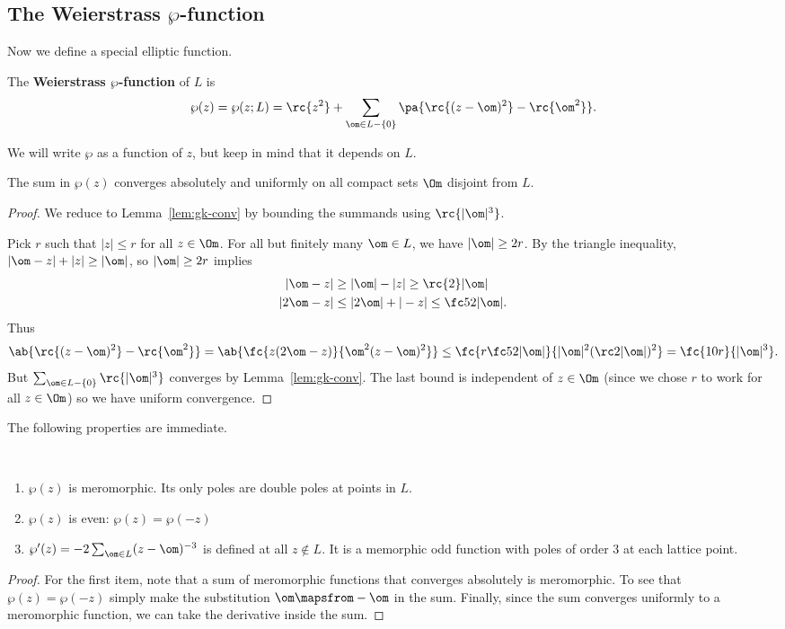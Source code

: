 \subsection{The Weierstrass $\wp$-function}\label{sec:wp}
Now we define a special elliptic function.
\begin{df}
The \textbf{Weierstrass $\wp$-function} of $L$ is 
\[
\wp(z)=\wp(z;L)
=\rc{z^2}+\sum_{\om\in L-\{0\}} \pa{
\rc{(z-\om)^2}-\rc{\om^2}
}.
\]
\end{df}
We will write $\wp$ as a function of $z$, but keep in mind that it depends on $L$.
\begin{lem}
The sum in $\wp(z)$ converges absolutely and uniformly on all compact sets $\Om$ disjoint from $L$.
\end{lem}
\begin{proof}
We reduce to Lemma~\ref{lem:gk-conv} by bounding the summands using $\rc{|\om|^3}$.

Pick $r$ such that $|z|\le r$ for all $z\in \Om$. For all but finitely many $\om\in L$, we have $|\om|\ge 2r$. By the triangle inequality, $|\om-z|+|z|\ge |\om|$, so $|\om|\ge 2r$ implies
\begin{align*}
|\om-z|&\ge |\om|-|z|\ge \rc{2}|\om|\\
|2\om-z|&\le |2\om|+|-z|\le \fc 52 |\om|.
\end{align*}
Thus 
\[
\ab{
\rc{(z-\om)^2}
-
\rc{\om^2}
}
=
\ab{\fc{z(2\om-z)}{\om^2(z-\om)^2}}
\le
\fc{r\fc52|\om|}{|\om|^2(\rc2|\om|)^2}=\fc{10r}{|\om|^3}.
\]
But $\sum_{\om\in L-\{0\}}\rc{|\om|^3}$ converges by  Lemma~\ref{lem:gk-conv}. The last bound is independent of $z\in \Om$ (since we chose $r$ to work for all $z\in \Om$) so we have uniform convergence.
\end{proof}
The following properties are immediate.
\begin{cor}$\,$
\begin{enumerate}
\item
$\wp(z)$ is meromorphic. Its only poles are double poles at points in $L$.
\item
$\wp(z)$ is even: $\wp(z)=\wp(-z)$
\item
$\wp'(z)=-2\sum_{\om\in L} (z-\om)^{-3}$ is defined at all $z\nin L$. It is a memorphic odd function with poles of order 3 at each lattice point.
\end{enumerate}
\end{cor}
\begin{proof}
For the first item, note that a sum of meromorphic functions that converges absolutely is meromorphic. To see that $\wp(z)=\wp(-z)$ simply make the substitution $\om\mapsfrom -\om$ in the sum. Finally, since the sum converges uniformly to a meromorphic function, we can take the derivative inside the sum.
\end{proof}
